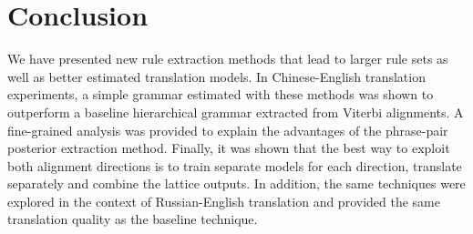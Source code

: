 \section{Conclusion}
\label{sec:extractionFromPosteriorsConclusion}

We have presented new rule extraction methods that lead to larger rule sets as
well as better estimated translation models. In Chinese-English translation experiments,
a simple grammar estimated with
these methods was shown to outperform a baseline hierarchical grammar extracted
from Viterbi alignments. A fine-grained analysis was provided to explain the
advantages of the phrase-pair posterior extraction method. Finally, it was shown
that the best way to exploit both alignment directions is to train separate
models for each direction, translate separately and combine the lattice outputs.
In addition, the same techniques were explored in the context of Russian-English
translation and provided the same translation quality as the baseline technique.

